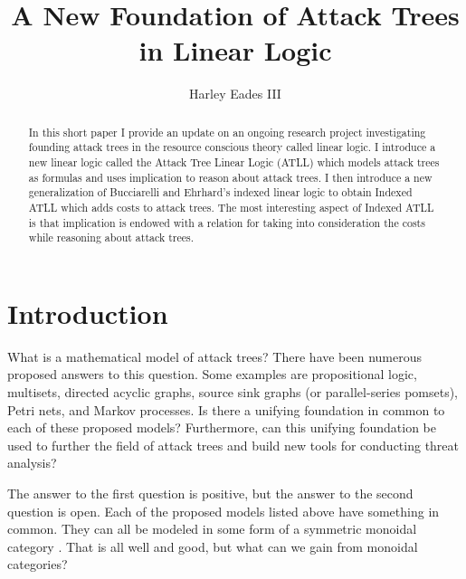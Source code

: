 \documentclass{llncs}
\date{}
\begin{document}

\title{A New Foundation of Attack Trees in Linear Logic}

\author{Harley Eades III}

\maketitle 

\begin{abstract}
  In this short paper I provide an update on an ongoing research
  project investigating founding attack trees in the resource
  conscious theory called linear logic.  I introduce a new linear
  logic called the Attack Tree Linear Logic (ATLL) which models attack
  trees as formulas and uses implication to reason about attack trees.
  I then introduce a new generalization of Bucciarelli and Ehrhard’s
  indexed linear logic to obtain Indexed ATLL which adds costs to
  attack trees.  The most interesting aspect of Indexed ATLL is that
  implication is endowed with a relation for taking into consideration
  the costs while reasoning about attack trees.
\end{abstract}

\section{Introduction}
\label{sec:introduction}
What is a mathematical model of attack trees?  There have been
numerous proposed answers to this question.  Some examples are
propositional logic, multisets, directed acyclic graphs, source sink
graphs (or parallel-series pomsets), Petri nets, and Markov processes.
Is there a unifying foundation in common to each of these proposed
models?  Furthermore, can this unifying foundation be used to further
the field of attack trees and build new tools for conducting threat
analysis?

The answer to the first question is positive, but the answer to the
second question is open.  Each of the proposed models listed above
have something in common.  They can all be modeled in some form of a
symmetric monoidal category
\cite{Tzouvaras:1998,Brown:1991,Fiore:2013,FrancescoAlbasini2010}.
That is all well and good, but what can we gain from monoidal
categories?
\end{document}
